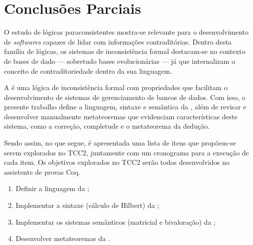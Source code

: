 \chapter{Conclusões Parciais}\label{chap:conclusao}

O estudo de lógicas paraconsistentes mostra-se relevante para o desenvolvimento de \textit{softwares} capazes de lidar com informações contraditórias. Dentro desta família de lógicas, os sistemas de inconsistência formal destacam-se no contexto de bases de dado {---} sobretudo bases evolucionárias {---} já que internalizam o conceito de contraditoriedade dentro da sua linguagem.

A \lfium{} é uma lógica de inconsistência formal com propriedades que facilitam o desenvolvimento de sistemas de gerenciamento de bancos de dados. Com isso, o presente trabalho define a linguagem, sintaxe e semântica da \lfium{}, além de revisar e desenvolver manualmente metateoremas que evidenciam características deste sistema, como a correção, completude e o metateorema da dedução.

Sendo assim, no que segue, é apresentada uma lista de itens que propõem-se serem explorados no TCC2, juntamente com um cronograma para a execução de cada item. Os objetivos explorados no TCC2 serão todos desenvolvidos no assistente de provas Coq.

\begin{enumerate}
    \item Definir a linguagem da \lfium{};
    \item Implementar a sintaxe (cálculo de Hilbert) da \lfium{};
    \item Implementar os sistemas semânticos (matricial e bivaloração) da \lfium{};
    \item Desenvolver metateoremas da \lfium{}.
\end{enumerate}



